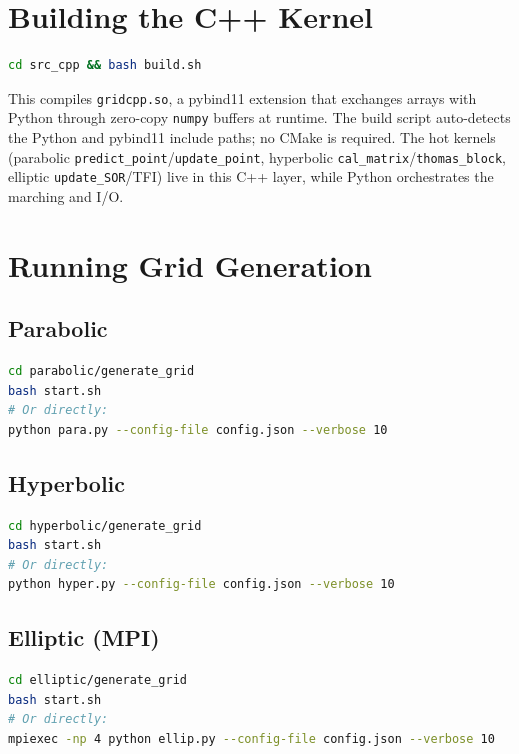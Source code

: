 \documentclass[11pt,a4paper]{report}
\begin{document}
\section{Building the C++ Kernel}

\begin{lstlisting}[language=bash]
cd src_cpp && bash build.sh
\end{lstlisting}

This compiles \texttt{gridcpp.so}, a pybind11 extension that exchanges arrays with Python through zero-copy \texttt{numpy} buffers at runtime. The build script auto-detects the Python and pybind11 include paths; no CMake is required. The hot kernels (parabolic \texttt{predict\_point}/\texttt{update\_point}, hyperbolic \texttt{cal\_matrix}/\texttt{thomas\_block}, elliptic \texttt{update\_SOR}/TFI) live in this C++ layer, while Python orchestrates the marching and I/O.

\section{Running Grid Generation}

\subsection{Parabolic}
\begin{lstlisting}[language=bash]
cd parabolic/generate_grid
bash start.sh
# Or directly:
python para.py --config-file config.json --verbose 10
\end{lstlisting}

\subsection{Hyperbolic}
\begin{lstlisting}[language=bash]
cd hyperbolic/generate_grid
bash start.sh
# Or directly:
python hyper.py --config-file config.json --verbose 10
\end{lstlisting}

\subsection{Elliptic (MPI)}
\begin{lstlisting}[language=bash]
cd elliptic/generate_grid
bash start.sh
# Or directly:
mpiexec -np 4 python ellip.py --config-file config.json --verbose 10
\end{lstlisting}
\end{document}
